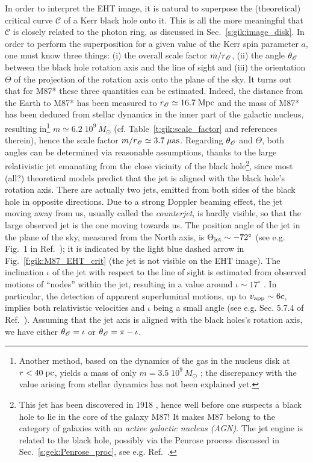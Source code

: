 In order to interpret the EHT image, it is natural to superpose the (theoretical)
critical curve $\mathscr{C}$ of a Kerr black hole
onto it. This is all the more meaningful that $\mathscr{C}$ is closely related to
the photon ring, as discussed in Sec.~\ref{s:gik:image_disk}. In order to perform the
superposition for a given value of the Kerr spin parameter $a$, one must
know three things: (i) the overall scale factor $m/r_{\mathscr{O}}$, (ii) the angle $\theta_{\mathscr{O}}$ between the black hole rotation axis and the line of
sight and (iii) the orientation $\Theta$ of the projection of the rotation axis
onto the plane of the sky. It turns out that for M87* these three quantities can be estimated. Indeed, the distance from the Earth to M87* has been measured to
$r_{\mathscr{O}} \simeq 16.7 \; {\rm Mpc}$ and the mass of M87* has been deduced from stellar
dynamics in the inner part of the galactic nucleus, resulting in\footnote{Another method,
based on the dynamics of the gas in the nucleus disk at $r < 40 \; {\rm pc}$, yields
a mass of only $m = 3.5\; 10^9 \, M_\odot$ \cite{WalshBHS13}; the discrepancy
with the value arising from stellar dynamics has not been explained yet.}
$m\simeq 6.2\; 10^9 \, M_\odot$ (cf. Table~\ref{t:gik:scale_factor} and references therein), hence the scale factor $m/r_{\mathscr{O}} \simeq 3.7 \; \mu{\rm as}$. Regarding
$\theta_{\mathscr{O}}$ and $\Theta$, both angles can be determined via reasonable assumptions, thanks
to the large relativistic jet emanating from the close vicinity of the black hole\footnote{This jet has been discovered in 1918 \cite{Curtis1918}, hence
well before one suspects a black hole to lie
in the core of the galaxy M87! It makes M87 belong to the category of galaxies
with an \emph{active galactic nucleus (AGN)}. The jet engine
is related to the black hole, possibly via the Penrose process discussed in Sec.~\ref{s:gek:Penrose_proc}, see e.g. Ref.~\cite{AbramF13}.},
since most (all?) theoretical models predict that the jet is aligned with
the black hole's rotation axis. There are actually two jets, emitted from both
sides of the black hole in opposite directions. Due to a strong Doppler beaming effect,
the jet moving away from us, usually called the \emph{counterjet},
is hardly visible, so that the large observed jet is the one moving towards us.
The position angle of the jet in the plane of the sky, measured from the North axis,
is $\Theta_{\rm jet} \sim - 72^\circ$
(see e.g. Fig.~1 in Ref.~\cite{WalkeHDLJ18}); it is indicated by the light blue dashed
arrow in Fig.~\ref{f:gik:M87_EHT_crit} (the jet is not visible on the EHT image).
The inclination  $\iota$ of the jet with respect to the
line of sight is estimated from observed motions of ``nodes'' within the jet,
resulting in a value around $\iota \sim 17^\circ$
\cite{MerteLWH16,WalkeHDLJ18}. In particular, the detection of
apparent superluminal motions, up to $v_{\rm app} \sim 6 c$, implies
both relativistic velocities and $\iota$ being a small angle (see e.g. Sec. 5.7.4 of Ref.~\cite{Gourg13}).
Assuming that the jet axis is aligned with the black holes's rotation axis, we have either
$\theta_{\mathscr{O}} = \iota$ or $\theta_{\mathscr{O}} = \pi - \iota$.


